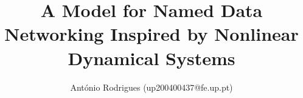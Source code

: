 \documentclass[english,journal]{IEEEtran}
\begin{document}
\title{A Model for Named Data Networking Inspired by 
Nonlinear Dynamical Systems}
\author{António Rodrigues (up200400437@fe.up.pt)}

\maketitle










%



%





\end{document}
